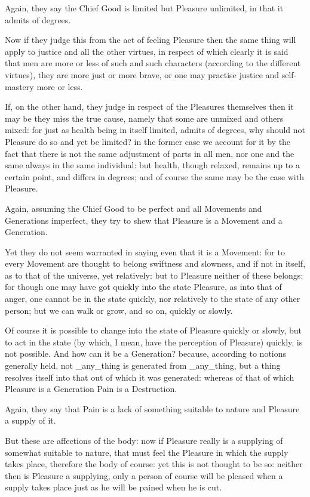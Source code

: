 Again, they say the Chief Good is limited but Pleasure unlimited, in
that it admits of degrees.

Now if they judge this from the act of feeling Pleasure then the same
thing will apply to justice and all the other virtues, in respect of
which clearly it is said that men are more or less of such and such
characters (according to the different virtues), they are more just or
more brave, or one may practise justice and self-mastery more or less.

If, on the other hand, they judge in respect of the Pleasures themselves
then it may be they miss the true cause, namely that some are unmixed
and others mixed: for just as health being in itself limited, admits of
degrees, why should not Pleasure do so and yet be limited? in the former
case we account for it by the fact that there is not the same adjustment
of parts in all men, nor one and the same always in the same individual:
but health, though relaxed, remains up to a certain point, and differs
in degrees; and of course the same may be the case with Pleasure.

Again, assuming the Chief Good to be perfect and all Movements and
Generations imperfect, they try to shew that Pleasure is a Movement and
a Generation.

Yet they do not seem warranted in saying even that it is a Movement: for
to every Movement are thought to belong swiftness and slowness, and
if not in itself, as to that of the universe, yet relatively: but to
Pleasure neither of these belongs: for though one may have got quickly
into the state Pleasure, as into that of anger, one cannot be in the
state quickly, nor relatively to the state of any other person; but we
can walk or grow, and so on, quickly or slowly.

Of course it is possible to change into the state of Pleasure quickly or
slowly, but to act in the state (by which, I mean, have the perception
of Pleasure) quickly, is not possible. And how can it be a Generation?
because, according to notions generally held, not _any_thing is
generated from _any_thing, but a thing resolves itself into that out
of which it was generated: whereas of that of which Pleasure is a
Generation Pain is a Destruction.

Again, they say that Pain is a lack of something suitable to nature and
Pleasure a supply of it.

But these are affections of the body: now if Pleasure really is a
supplying of somewhat suitable to nature, that must feel the Pleasure in
which the supply takes place, therefore the body of course: yet this
is not thought to be so: neither then is Pleasure a supplying, only a
person of course will be pleased when a supply takes place just as he
will be pained when he is cut.

